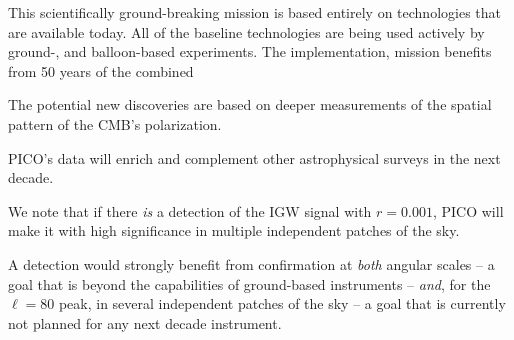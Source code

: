 \documentclass[PICOReport.tex]{subfiles}
\begin{document}
This scientifically ground-breaking mission is based entirely on technologies that are available today. All of the baseline technologies are being used actively by ground-, and balloon-based experiments. The implementation, mission benefits from 50 years of the combined 


The potential new discoveries are based on deeper measurements of the spatial pattern of the CMB's polarization.


PICO's data will enrich and complement other astrophysical surveys in the next decade.

We note that if there {\it is} a detection of the \ac{IGW} signal with $r=0.001$, PICO will make it with high significance in multiple independent patches of the sky. 


A detection would strongly benefit from confirmation at {\it both} angular 
scales -- a goal that is beyond the capabilities of ground-based instruments -- {\it and}, for the $\ell = 80$ peak, 
in several independent patches of the sky -- a goal that is currently not planned for any next decade instrument. 
\end{document}
